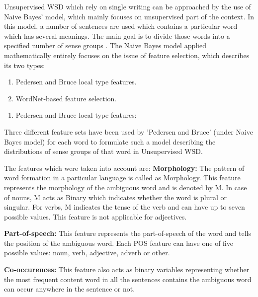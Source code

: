 Unsupervised WSD which rely on single writing can be approached by the use of Naive Bayes' model, which mainly focuses on unsupervised part of the context. 
In this model, a number of sentences are used which contains a particular word which has several meanings. 
The main goal is to divide those words into a specified number of sense groups \cite{4028513}.
The Naive Bayes model applied mathematically entirely focuses on the issue of feature selection, which describes its two types:

\begin{enumerate}
	\item Pedersen and Bruce local type features.
	\item WordNet-based feature selection.
\end{enumerate}

\begin{enumerate}
	\item Pedersen and Bruce local type features:
\end{enumerate}
Three different feature sets have been used by 'Pedersen and Bruce' (under Naive Bayes model) for each word to formulate such a model describing the distributions of sense groups of that word in Unsupervised WSD.

The features which were taken into account are:
\textbf{Morphology:} The pattern of word formation in a particular language is called as Morphology.
This feature represents the morphology of the ambiguous word and is denoted by M.
In case of nouns, M acts as Binary which indicates whether the word is plural or singular.
For verbs, M indicates the tense of the verb and can have up to seven possible values.
This feature is not applicable for adjectives.

\textbf{Part-of-speech:} This feature represents the part-of-speech of the word and tells the position of the ambiguous word.
Each POS feature can have one of five possible values: noun, verb, adjective, adverb or other.

\textbf{Co-occurences:} This feature also acts as binary variables representing whether the most frequent content word in all the sentences contains the ambiguous word can occur anywhere in the sentence or not.

